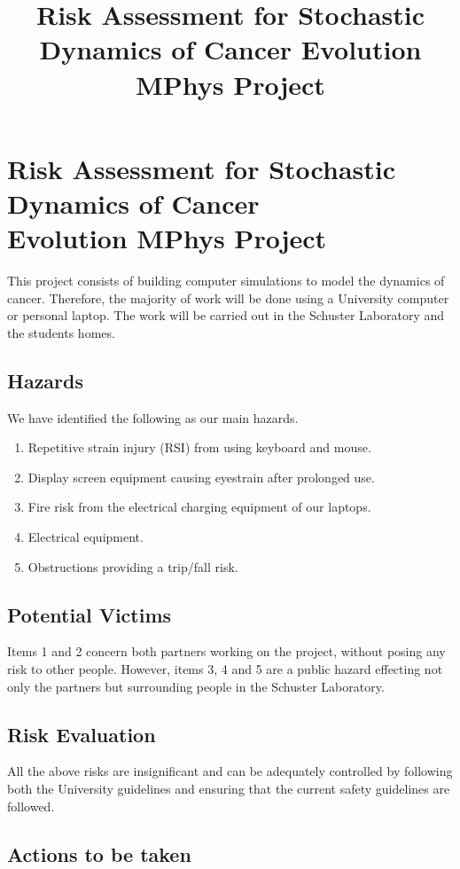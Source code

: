 \documentclass[11pt, a4paper]{article}
\title{Risk Assessment for Stochastic Dynamics of Cancer Evolution MPhys Project}
\date{}
\begin{document}
\section*{Risk Assessment for Stochastic Dynamics of Cancer \\ Evolution MPhys Project}


This project consists of building computer simulations to model the dynamics of cancer. Therefore, the majority of work will be done using a University computer or personal laptop. The work will be carried out in the Schuster Laboratory and the students homes. 


\subsection*{Hazards}

We have identified the following as our main hazards. 

\begin{enumerate}
\item Repetitive strain injury (RSI) from using keyboard and mouse. 
\item Display screen equipment causing eyestrain after prolonged use.
\item Fire risk from the electrical charging equipment of our laptops. 
\item Electrical equipment. 
\item Obstructions providing a trip/fall risk.
\end{enumerate}

\subsection*{Potential Victims}

Items 1 and 2 concern both partners working on the project, without posing any risk to other people. However, items 3, 4 and 5 are a public hazard effecting not only the partners but surrounding people in the Schuster Laboratory.  

\subsection*{Risk Evaluation}

All the above risks are insignificant and can be adequately controlled by following both the University guidelines and ensuring that the current safety guidelines are followed. 

\subsection*{Actions to be taken}
\end{document}
